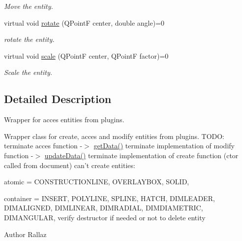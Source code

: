 \begin{DoxyCompactItemize}
\begin{DoxyCompactList}\small\item\em Move the entity. \end{DoxyCompactList}\item 
virtual void \hyperlink{classPlug__Entity_a2a4a27a59029c7c43f6ee7750db1d4af}{rotate} (Q\-Point\-F center, double angle)=0
\begin{DoxyCompactList}\small\item\em rotate the entity. \end{DoxyCompactList}\item 
virtual void \hyperlink{classPlug__Entity_a93f8d76ad98f7f5b0f24f111681c31a4}{scale} (Q\-Point\-F center, Q\-Point\-F factor)=0
\begin{DoxyCompactList}\small\item\em Scale the entity. \end{DoxyCompactList}\end{DoxyCompactItemize}


\subsection{Detailed Description}
Wrapper for acces entities from plugins. 

Wrapper class for create, acces and modify entities from plugins. T\-O\-D\-O\-: terminate acces function -\/$>$ \hyperlink{classPlug__Entity_a3e2acf80beecc81e0e7596bf782b869a}{get\-Data()} terminate implementation of modify function -\/$>$ \hyperlink{classPlug__Entity_a54501af73a74d97116cfac8b145049ca}{update\-Data()} terminate implementation of create function (ctor called from document) can't create entities\-:
\begin{DoxyItemize}
\item atomic = C\-O\-N\-S\-T\-R\-U\-C\-T\-I\-O\-N\-L\-I\-N\-E, O\-V\-E\-R\-L\-A\-Y\-B\-O\-X, S\-O\-L\-I\-D,
\item container = I\-N\-S\-E\-R\-T, P\-O\-L\-Y\-L\-I\-N\-E, S\-P\-L\-I\-N\-E, H\-A\-T\-C\-H, D\-I\-M\-L\-E\-A\-D\-E\-R, D\-I\-M\-A\-L\-I\-G\-N\-E\-D, D\-I\-M\-L\-I\-N\-E\-A\-R, D\-I\-M\-R\-A\-D\-I\-A\-L, D\-I\-M\-D\-I\-A\-M\-E\-T\-R\-I\-C, D\-I\-M\-A\-N\-G\-U\-L\-A\-R, verify destructor if needed or not to delete entity \begin{DoxyAuthor}{Author}
Rallaz 
\end{DoxyAuthor}

\end{DoxyItemize}

